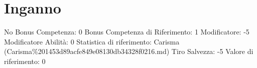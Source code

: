 \section{Inganno}\label{inganno}

\begin{description}
\tightlist
\item[Tags: ABI]
No Bonus Competenza: 0 Bonus Competenza di Riferimento: 1 Modificatore:
-5 Modificatore Abilità: 0 Statistica di riferimento: Carisma
(Carisma\%201453d89acfe849e08130db34328f0216.md) Tiro Salvezza: -5
Valore di riferimento: 0
\end{description}
